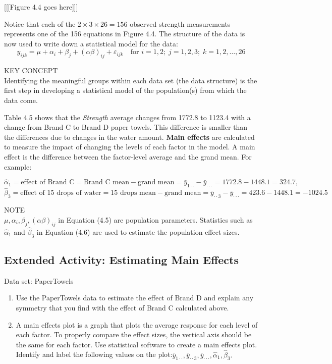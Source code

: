 \documentclass[
]{report}
\begin{document}
{[}{[}{[}Figure 4.4 goes here{]}{]}{]}

Notice that each of the \(2 \times 3 \times 26 = 156\) observed strength measurements represents one of the 156 equations in Figure 4.4. The structure of the data is now used to write down a statistical model for the data:
\[
y_{ijk} = \mu + \alpha_i + \beta_j + (\alpha\beta)_{ij} + \varepsilon_{ijk}
\quad\text{for } i = 1,2;\; j = 1,2,3;\; k = 1,2,\dots,26
\tag{4.5}
\]

KEY CONCEPT\\
Identifying the meaningful groups within each data set (the data structure) is the first step in developing a statistical model of the population(s) from which the data come.

Table 4.5 shows that the \emph{Strength} average changes from 1772.8 to 1123.4 with a change from Brand C to Brand D paper towels. This difference is smaller than the differences due to changes in the water amount. \textbf{Main effects} are calculated to measure the impact of changing the levels of each factor in the model. A main effect is the difference between the factor-level average and the grand mean. For example:

\[
\hat\alpha_1
= \text{effect of Brand C}
= \text{Brand C mean} - \text{grand mean}
= \bar y_{1\cdot\cdot} - \bar y_{\cdot\cdot\cdot}
= 1772.8 - 1448.1
= 324.7,
\]
\[
\hat\beta_3
= \text{effect of 15 drops of water}
= \text{15 drops mean} - \text{grand mean}
= \bar y_{\cdot\cdot3} - \bar y_{\cdot\cdot\cdot}
= 423.6 - 1448.1
= -1024.5
\tag{4.6}
\]

NOTE\\
\(\mu,\alpha_i,\beta_j,(\alpha\beta)_{ij}\) in Equation (4.5) are population parameters. Statistics such as \(\hat\alpha_1\) and \(\hat\beta_3\) in Equation (4.6) are used to estimate the population effect sizes.

\subsection{Extended Activity: Estimating Main Effects}\label{extended-activity-estimating-main-effects}

Data set: PaperTowels

\begin{enumerate}
\def\labelenumi{\arabic{enumi}.}
\setcounter{enumi}{23}
\item
  Use the PaperTowels data to estimate the effect of Brand D and explain any symmetry that you find with the effect of Brand C calculated above.
\item
  A main effects plot is a graph that plots the average response for each level of each factor. To properly compare the effect sizes, the vertical axis should be the same for each factor. Use statistical software to create a main effects plot. Identify and label the following values on the plot:\(\bar y_{1\cdot\cdot},\bar y_{\cdot\cdot3},\bar y_{\cdot\cdot\cdot}, \hat\alpha_1, \hat\beta_3.\)
\end{enumerate}
\end{document}
